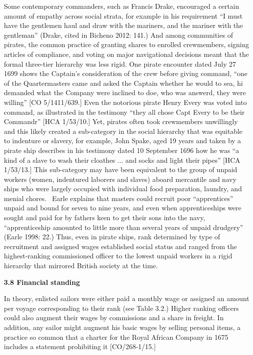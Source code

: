 \begin{styleStandard}
Some contemporary commanders, such as Francis Drake, encouraged a certain amount of empathy across social strata, for example in his requirement “I must have the gentlemen haul and draw with the mariners, and the mariner with the gentleman” (Drake, cited in Bicheno 2012: 141.) And among communities of pirates, the common practice of granting shares to enrolled crewmembers, signing articles of compliance, and voting on major navigational decisions meant that the formal three-tier hierarchy was less rigid. One pirate encounter dated July 27 1699 shows the Captain’s consideration of the crew before giving command, “one of the Quartermasters came and asked the Captain whether he would to sea, hi demanded what the Company were inclined to doe, who was answerd, they were willing” [CO 5/1411/639.] Even the notorious pirate Henry Every was voted into command, as illustrated in the testimony “they all chose Capt Every to be their Commandr” [HCA 1/53/10.] Yet, pirates often took crewmembers unwillingly and this likely created a sub-category in the social hierarchy that was equitable to indenture or slavery, for example, John Spake, aged 19 years and taken by a pirate ship describes in his testimony dated 10 September 1696 how he was “a kind of a slave to wash their cloathes ... and socks and light their pipes” [HCA 1/53/13.] This sub-category may have been equivalent to the group of unpaid workers (women, indentured laborers and slaves) aboard mercantile and navy ships who were largely occupied with individual food preparation, laundry, and menial chores. \ Earle explains that masters could recruit poor “apprentices” unpaid and bound for seven to nine years, and even when apprenticeships were sought and paid for by fathers keen to get their sons into the navy, “apprenticeship amounted to little more than several years of unpaid drudgery” (Earle 1998: 22.) Thus, even in pirate ships, rank determined by type of recruitment and assigned wages established social status and ranged from the highest-ranking commissioned officer to the lowest unpaid workers in a rigid hierarchy that mirrored British society at the time. 
\end{styleStandard}


\begin{styleStandard}
\textbf{3.8 Financial standing}
\end{styleStandard}


\begin{styleStandard}
In theory, enlisted sailors were either paid a monthly wage or assigned an amount per voyage corresponding to their rank (see Table 3.2.) Higher ranking officers could also augment their wages by commissions and a share in freight. In addition, any sailor might augment his basic wages by selling personal items, a practice so common that a charter for the Royal African Company in 1675 includes a statement prohibiting it [CO/268-1/15.] \ 
\end{styleStandard}


